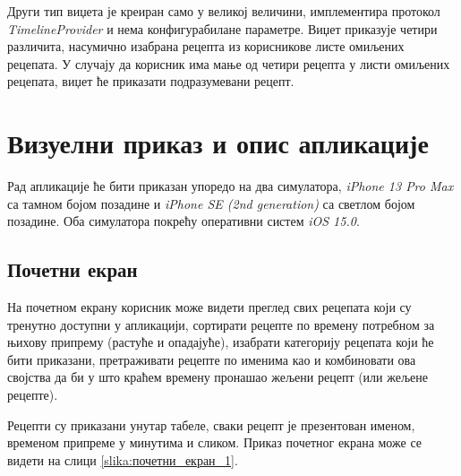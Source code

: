 \documentclass[12pt,oneside]{memoir}
\begin{document}
Други тип виџета је креиран само у великој величини, имплементира протокол \textit{TimelineProvider} и нема конфигурабилане параметре. Виџет приказује четири различита, насумично изабрана рецепта из корисникове листе омиљених рецепата. У случају да корисник има мање од четири рецепта у листи омиљених рецепата, виџет ће приказати подразумевани рецепт.

\section{Визуелни приказ и опис апликације}

\indent Рад апликације ће бити приказан упоредо на два симулатора, \textit{iPhone 13 Pro Max} са тамном бојом позадине и \textit{iPhone SE (2nd generation)} са светлом бојом позадине. Оба симулатора покрећу оперативни систем \textit{iOS 15.0}.

\subsection{Почетни екран}

\indent На почетном екрану корисник може видети преглед свих рецепата који су тренутно доступни у апликацији, сортирати рецепте по времену потребном за њихову припрему (растуће и опадајуће), изабрати категорију рецепата који ће бити приказани, претраживати рецепте по именима као и комбиновати ова својства да би у што краћем времену пронашао жељени рецепт (или жељене рецепте).

\indent Рецепти су приказани унутар табеле, сваки рецепт је презентован именом, временом припреме у минутима и сликом. Приказ почетног екрана може се видети на слици \ref{slika:почетни_екран_1}.
\end{document}
